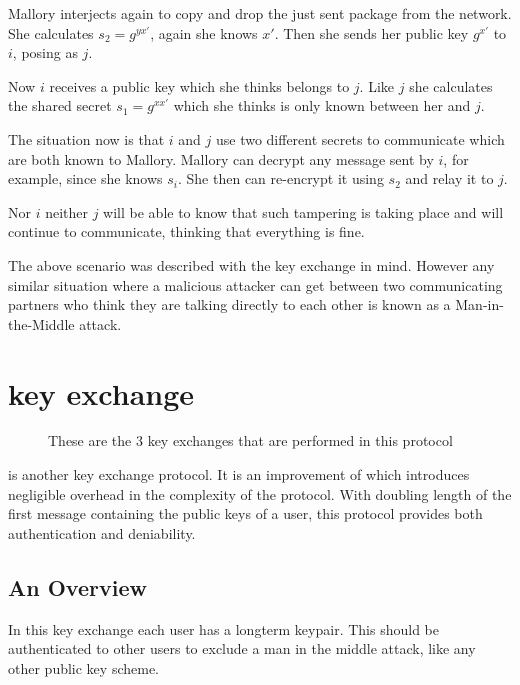 Mallory interjects again to copy and drop the just sent package from the network.
She calculates $s_2 = g^{yx\prime}$, again she knows $x\prime$.
Then she sends her public key $g^{x\prime}$ to $i$, posing as $j$.

Now $i$ receives a public key which she thinks belongs to $j$.
Like $j$ she calculates the shared secret $s_1 = g^{xx\prime}$ which she thinks is only known between her and $j$.

The situation now is that $i$ and $j$ use two different secrets to communicate which are both known to Mallory.
Mallory can decrypt any message sent by $i$, for example, since she knows $s_i$.
She then can re-encrypt it using $s_2$ and relay it to $j$.

Nor $i$ neither $j$ will be able to know that such tampering is taking place and will continue to communicate, thinking that everything is fine.

The above scenario was described with the \dhname key exchange in mind.
However any similar situation where a malicious attacker can get between two communicating partners who think they are talking directly to each other is known as a Man-in-the-Middle attack.

\section{\tdhname key exchange}
\begin{figure}[h]
\begin{centering}
  
  \caption[\tdhname in a picture]{These are the 3 \dhname key exchanges that are performed in this protocol}
\end{centering}
\end{figure}

\tdhname is another key exchange protocol.
It is an improvement of \dhname which introduces negligible overhead in the complexity of the protocol.
With doubling length of the first message containing the public keys of a user, this protocol provides both authentication and deniability.

\subsection{An Overview}

In this key exchange each user has a \dhname longterm keypair.
This should be authenticated to other users to exclude a man in the middle attack, like any other public key scheme.

